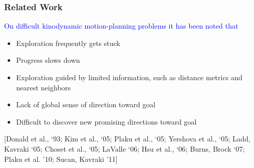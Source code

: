 \documentclass[10pt,t]{beamer}
\begin{document}
\begin{frame}
\frametitle{Related Work}

\textcolor{blue}{On difficult kinodynamic motion-planning problems it
  has been noted that}


\begin{itemize}
\item Exploration frequently gets stuck
\item Progress slows down
\end{itemize}


\vspace*{5mm}
\begin{itemize}
\item Exploration guided by limited information, such as distance   metrics and nearest neighbors
\item Lack of global sense of direction toward goal
\item Difficult to discover new promising directions toward goal
\end{itemize}

\vspace*{3mm}

{\footnotesize{
[Donald et al., ‘93; Kim et al., ‘05; Plaku et al., ‘05; Yershova et
al., ‘05; Ladd, Kavraki  ‘05; Choset et al., ‘05; LaValle ‘06; Hsu et
al., ‘06; Burns, Brock ‘07; Plaku et al. '10;
Sucan, Kavraki '11]}}

\end{frame}
\end{document}
